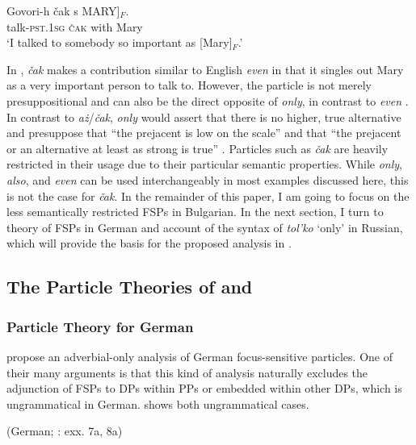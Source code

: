 \documentclass[output=paper,colorlinks,citecolor=brown]{langscibook}
\begin{document}
\ea\label{Tomaszewicz:basic1} 
\gll Govori-h \v{c}ak s \minsp{[} MARY]$_{F}$. \\
talk-\textsc{pst.1sg} \textsc{\v{c}ak} with {} Mary \\
\glt `I talked to somebody so important as [Mary]$_{F}$.'
\z

\noindent In , \textit{\v cak} makes a contribution similar to English \textit{even} in that it singles out Mary as a very important person to talk to. However, the particle is not merely presuppositional and can also be the direct opposite of \textit{only}, in contrast to \textit{even} \citep{Tomaszewicz2013}. In contrast to \textit{a\.z}/\textit{\v cak}, \textit{only} would assert that there is no higher, true alternative and presuppose that ``the prejacent is low on the scale'' and that ``the prejacent or an alternative at least as strong is true'' \citep[321]{Tomaszewicz2013}.  
Particles such as \textit{\v cak} are heavily restricted in their usage due to their particular semantic properties. While \textit{only}, \textit{also}, and \textit{even} can be used interchangeably in most examples discussed here, this is not the case for \textit{\v cak}. In the remainder of this paper, I am going to focus on the less semantically restricted FSPs in Bulgarian. In the next section, I turn to  theory of FSPs in German and  account of the syntax of \textit{tol'ko} `only' in Russian, which will provide the basis for the proposed analysis in . 

\subsection{The Particle Theories of \citet{BuringHartmann2001} and \citet{Zanon2018}}\label{sec:2.2}

\subsubsection{ Particle Theory for German}\label{sec:2.2.1} \citet{BuringHartmann2001} propose an adverbial-only analysis of German focus-sensitive particles. One of their many arguments is that this kind of analysis naturally excludes the adjunction of FSPs to DPs within PPs or embedded within other DPs, which is ungrammatical in German.  shows both ungrammatical cases. 

\ea\label{BuringHartmann:basic1} 
\hfill (German; \citealt{BuringHartmann2001}: exx. 7a, 8a)
\z
\z 
\end{document}

